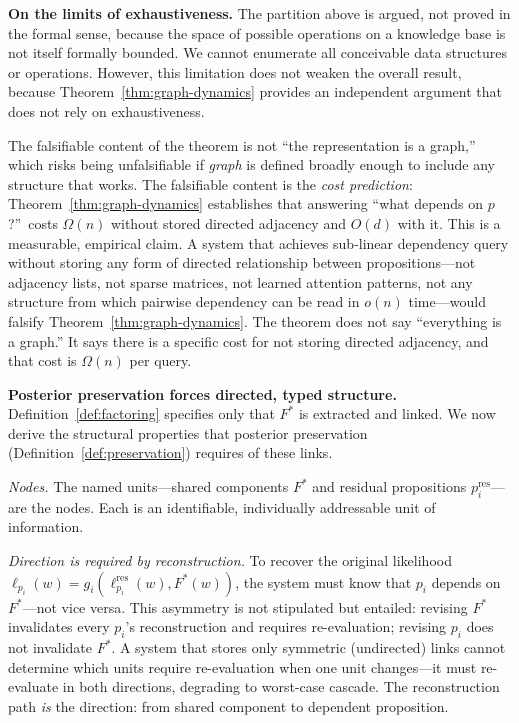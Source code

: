 \documentclass[11pt]{article}
\theoremstyle{definition}
\begin{document}
\textbf{On the limits of exhaustiveness.}
The partition above is argued, not proved in the formal sense, because
the space of possible operations on a knowledge base is not itself
formally bounded. We cannot enumerate all conceivable data structures
or operations. However, this limitation does not weaken the overall
result, because Theorem~\ref{thm:graph-dynamics} provides an
independent argument that does not rely on exhaustiveness.

The falsifiable content of the theorem is not ``the representation is a
graph,'' which risks being unfalsifiable if \emph{graph} is defined
broadly enough to include any structure that works. The falsifiable
content is the \emph{cost prediction}: Theorem~\ref{thm:graph-dynamics}
establishes that answering ``what depends on $p$?''\ costs $\Omega(n)$
without stored directed adjacency and $O(d)$ with it. This is a
measurable, empirical claim. A system that achieves sub-linear
dependency query without storing any form of directed relationship
between propositions---not adjacency lists, not sparse matrices, not
learned attention patterns, not any structure from which pairwise
dependency can be read in $o(n)$ time---would falsify
Theorem~\ref{thm:graph-dynamics}. The theorem does not say ``everything
is a graph.'' It says there is a specific cost for not storing directed
adjacency, and that cost is $\Omega(n)$ per query.

\textbf{Posterior preservation forces directed, typed structure.}
Definition~\ref{def:factoring} specifies only that $F^*$ is extracted
and linked. We now derive the structural properties that posterior
preservation (Definition~\ref{def:preservation}) requires of these
links.

\emph{Nodes.} The named units---shared components $F^*$ and residual
propositions $p_i^{\text{res}}$---are the nodes. Each is an
identifiable, individually addressable unit of information.

\emph{Direction is required by reconstruction.}
To recover the original likelihood $\ell_{p_i}(w) =
g_i(\ell_{p_i}^{\text{res}}(w), F^*(w))$, the system must know that
$p_i$ depends on $F^*$---not vice versa. This asymmetry is not
stipulated but entailed: revising $F^*$ invalidates every $p_i$'s
reconstruction and requires re-evaluation; revising $p_i$ does not
invalidate $F^*$. A system that stores only symmetric (undirected)
links cannot determine which units require re-evaluation when one
unit changes---it must re-evaluate in both directions, degrading
to worst-case cascade. The reconstruction path \emph{is} the
direction: from shared component to dependent proposition.
\end{document}
